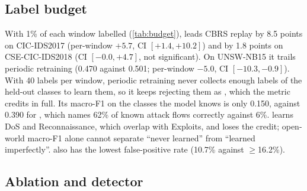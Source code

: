 \subsection{Label budget}
With 1\% of each window labelled (\cref{tab:budget}), \nova{} leads CBRS replay by 8.5 points on CIC-IDS2017
(per-window $+5.7$, CI $[+1.4, +10.2]$) and by 1.8 points on CSE-CIC-IDS2018 (CI $[-0.0, +4.7]$, not
significant). On UNSW-NB15 it trails periodic retraining (0.470 against 0.501; per-window $-5.0$, CI
$[-10.3, -0.9]$). With 40 labels per window, periodic retraining never
collects enough labels of the held-out classes to learn them, so it keeps rejecting them as \unk{}, which the
metric credits in full. Its macro-F1 on the classes the model knows is only 0.150, against 0.390 for \nova{}, which
names 62\% of known attack flows correctly against 6\%. \nova{} learns DoS and Reconnaissance, which overlap with
Exploits, and loses the \unk{} credit; open-world macro-F1 alone cannot separate ``never learned'' from ``learned
imperfectly''. \nova{} also has the lowest false-positive rate (10.7\% against $\geq$16.2\%).

\begin{table}[t]
\centering
\caption{Label budget 1\%: OW macro-F1 and FPR (\%), mean over five seeds; best per column in bold.}
\label{tab:budget}
\footnotesize
\setlength{\tabcolsep}{3pt}
\end{table}

\subsection{Ablation and detector}
\begin{table}[t]
\centering
\caption{Ablation (budget 10\%): OW-F1 (change in points) and FPR (\%) with one component removed. Mean over
three seeds; full \nova{} over the same seeds. Only CIC-IDS2017 was used for design.}
\label{tab:ablation}
\footnotesize
\setlength{\tabcolsep}{2pt}
\end{table}

